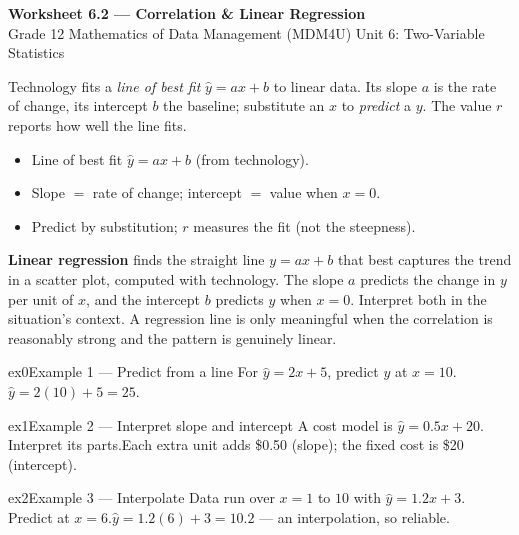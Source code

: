 \documentclass[11pt]{article}
\begin{document}
\begin{center}
{\LARGE\bfseries\color{titleblue}Worksheet 6.2 --- Correlation \& Linear Regression}\\[2pt]
{\small Grade 12 Mathematics of Data Management (MDM4U) \textperiodcentered{} Unit 6: Two-Variable Statistics}
\end{center}

\begin{ideabox}
Technology fits a \emph{line of best fit} $\hat y=ax+b$ to linear data. Its slope $a$ is the rate of change, its intercept $b$ the baseline; substitute an $x$ to \emph{predict} a $y$. The value $r$ reports how well the line fits.
\begin{itemize}[leftmargin=*,itemsep=2pt]
  \item Line of best fit $\hat y=ax+b$ (from technology).
  \item Slope $=$ rate of change; intercept $=$ value when $x=0$.
  \item Predict by substitution; $r$ measures the fit (not the steepness).
\end{itemize}
\end{ideabox}

\begin{learnbox}
\textbf{Linear regression} finds the straight line $y=ax+b$ that best captures the trend in a scatter plot, computed with technology.
The slope $a$ predicts the change in $y$ per unit of $x$, and the intercept $b$ predicts $y$ when $x=0$. Interpret both in the situation's context.
A regression line is only meaningful when the correlation is reasonably strong and the pattern is genuinely linear.
\end{learnbox}


\begin{example}{ex0}{Example 1 --- Predict from a line}
For $\hat y=2x+5$, predict $y$ at $x=10$.\soln $\hat y=2(10)+5=25$.
\end{example}

\begin{example}{ex1}{Example 2 --- Interpret slope and intercept}
A cost model is $\hat y=0.5x+20$. Interpret its parts.\soln Each extra unit adds \$0.50 (slope); the fixed cost is \$20 (intercept).
\end{example}

\begin{example}{ex2}{Example 3 --- Interpolate}
Data run over $x=1$ to $10$ with $\hat y=1.2x+3$. Predict at $x=6$.\soln $\hat y=1.2(6)+3=10.2$ --- an interpolation, so reliable.
\end{example}
\end{document}
